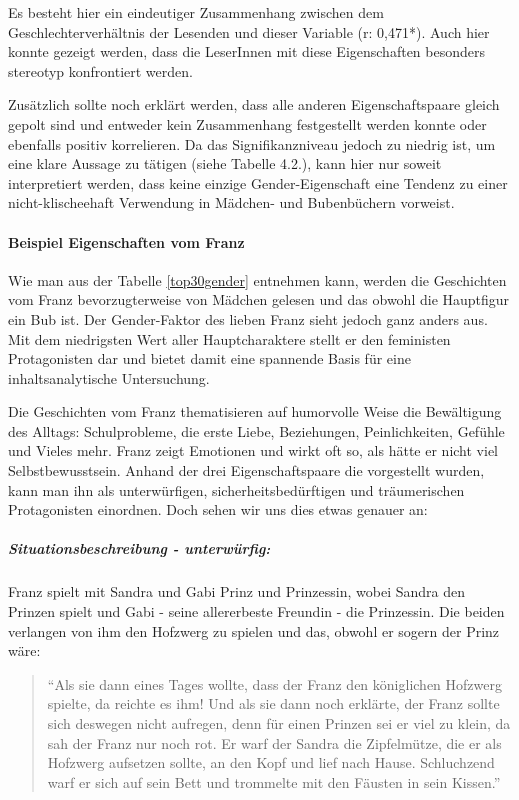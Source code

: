 Es besteht hier ein eindeutiger Zusammenhang zwischen dem
Geschlechterverhältnis der Lesenden und dieser Variable (r: 0,471*).
Auch hier konnte gezeigt werden, dass die LeserInnen mit diese
Eigenschaften besonders stereotyp konfrontiert werden.

Zusätzlich sollte noch erklärt werden, dass alle anderen
Eigenschaftspaare gleich gepolt sind und entweder kein Zusammenhang
festgestellt werden konnte oder ebenfalls positiv korrelieren. Da das
Signifikanzniveau jedoch zu niedrig ist, um eine klare Aussage zu
tätigen (siehe Tabelle 4.2.), kann hier nur soweit interpretiert werden,
dass keine einzige Gender-Eigenschaft eine Tendenz zu einer
nicht-klischeehaft Verwendung in Mädchen- und Bubenbüchern vorweist.

\paragraph{Beispiel Eigenschaften vom Franz}

Wie man aus der Tabelle \ref{top30gender} entnehmen kann, werden die
Geschichten vom Franz bevorzugterweise von Mädchen gelesen und das
obwohl die Hauptfigur ein Bub ist. Der Gender-Faktor des lieben Franz
sieht jedoch ganz anders aus. Mit dem niedrigsten Wert aller
Hauptcharaktere stellt er den feministen Protagonisten dar und bietet
damit eine spannende Basis für eine inhaltsanalytische Untersuchung.

Die Geschichten vom Franz thematisieren auf humorvolle Weise die
Bewältigung des Alltags: Schulprobleme, die erste Liebe, Beziehungen,
Peinlichkeiten, Gefühle und Vieles mehr. Franz zeigt Emotionen und wirkt
oft so, als hätte er nicht viel Selbstbewusstsein. Anhand der drei
Eigenschaftspaare die vorgestellt wurden, kann man ihn als
unterwürfigen, sicherheitsbedürftigen und träumerischen Protagonisten
einordnen. Doch sehen wir uns dies etwas genauer an:

\subparagraph{Situationsbeschreibung - unterwürfig:}

Franz spielt mit Sandra und Gabi Prinz und Prinzessin, wobei Sandra den
Prinzen spielt und Gabi - seine allererbeste Freundin - die Prinzessin.
Die beiden verlangen von ihm den Hofzwerg zu spielen und das, obwohl er
sogern der Prinz wäre:

\begin{quote}
``Als sie dann eines Tages wollte, dass der Franz den königlichen
Hofzwerg spielte, da reichte es ihm! Und als sie dann noch erklärte, der
Franz sollte sich deswegen nicht aufregen, denn für einen Prinzen sei er
viel zu klein, da sah der Franz nur noch rot. Er warf der Sandra die
Zipfelmütze, die er als Hofzwerg aufsetzen sollte, an den Kopf und lief
nach Hause. Schluchzend warf er sich auf sein Bett und trommelte mit den
Fäusten in sein Kissen.'' \parencite[][30]{Noestlinger2010}
\end{quote}

